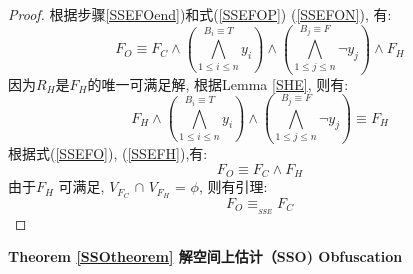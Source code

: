 \begin{proof}
根据步骤\ref{SSEFOend})和式(\ref{SSEFOP}) (\ref{SSEFON}), 有:
\begin{equation}\label{SSEFO}
F_{O} \equiv F_C \wedge
(\bigwedge_{1\leqslant i\leqslant n}^{B_i \equiv T}y_i)\wedge
(\bigwedge_{1\leqslant j\leqslant n}^{B_j \equiv F}\neg y_j) \wedge F_H
\end{equation}
因为${R_H}$是$F_H$的唯一可满足解,
根据Lemma \ref{SHE}, 则有:
\begin{equation}\label{SSEFH}
F_H \wedge (\bigwedge_{1\leqslant i\leqslant n}^{B_i \equiv T}y_i)\wedge
(\bigwedge_{1\leqslant j\leqslant n}^{B_j\equiv F}\neg y_j)\equiv F_H
\end{equation}
根据式(\ref{SSEFO}), (\ref{SSEFH}),有:
\begin{equation}\label{SSEEND}
F_O\equiv F_C \wedge F_H
\end{equation}
由于$F_H$ 可满足, $V_{F_C}$ $\cap$ $V_{F_H}$ = $\phi$, 则有引理:
\begin{equation}
F_O\equiv_{_{SSE}}  F_C
\end{equation}
\end{proof}

\textbf{Theorem \ref{SSOtheorem} 解空间上估计（SSO) Obfuscation}

